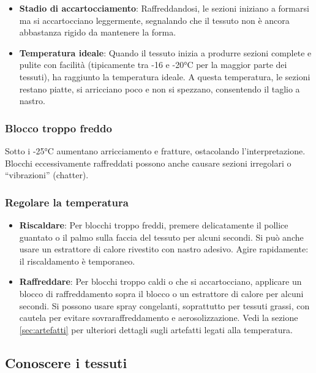 \begin{itemize}
\item \textbf{Stadio di accartocciamento}: Raffreddandosi, le sezioni iniziano a formarsi ma si accartocciano leggermente, segnalando che il tessuto non è ancora abbastanza rigido da mantenere la forma.
\item \textbf{Temperatura ideale}: Quando il tessuto inizia a produrre sezioni complete e pulite con facilità (tipicamente tra -16 e -20°C per la maggior parte dei tessuti), ha raggiunto la temperatura ideale. A questa temperatura, le sezioni restano piatte, si arricciano poco e non si spezzano, consentendo il taglio a nastro.
\end{itemize}

\subsubsection{Blocco troppo freddo}
Sotto i -25°C aumentano arricciamento e fratture, ostacolando l'interpretazione. Blocchi eccessivamente raffreddati possono anche causare sezioni irregolari o ``vibrazioni'' (chatter).

\subsubsection{Regolare la temperatura}
\begin{itemize}
\item \textbf{Riscaldare}: Per blocchi troppo freddi, premere delicatamente il pollice guantato o il palmo sulla faccia del tessuto per alcuni secondi. Si può anche usare un estrattore di calore rivestito con nastro adesivo. Agire rapidamente: il riscaldamento è temporaneo.
\item \textbf{Raffreddare}: Per blocchi troppo caldi o che si accartocciano, applicare un blocco di raffreddamento sopra il blocco o un estrattore di calore per alcuni secondi. Si possono usare spray congelanti, soprattutto per tessuti grassi, con cautela per evitare sovraraffreddamento e aerosolizzazione.
Vedi la sezione \ref{sec:artefatti} per ulteriori dettagli sugli artefatti legati alla temperatura.
\end{itemize}

\subsection{Conoscere i tessuti}
